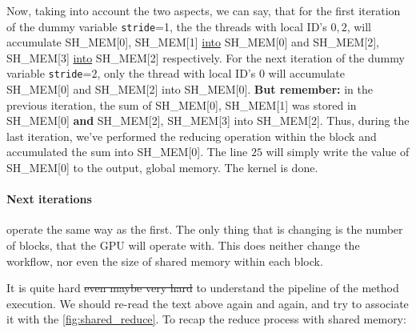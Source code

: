 Now, taking into account the two aspects, we can say, that for the first iteration of the dummy variable \verb|stride|=1, the 
the threads with local ID's $0,2$, will accumulate SH\_MEM[0], SH\_MEM[1] \underline{into} 
SH\_MEM[0] and SH\_MEM[2], SH\_MEM[3] \underline{into} SH\_MEM[2] respectively. 
For the next iteration of the dummy variable \verb|stride|=$2$, only the thread with local ID's $0$ 
will accumulate SH\_MEM[0] and SH\_MEM[2] into SH\_MEM[0]. \textbf{But remember: } in the previous iteration, 
the sum of SH\_MEM[0], SH\_MEM[1] was stored in SH\_MEM[0] \textbf{and} SH\_MEM[2], SH\_MEM[3] into SH\_MEM[2]. 
Thus, during the last iteration, we've performed the reducing operation within the block and accumulated the sum into SH\_MEM[0]. 
The line $25$ will simply write the value of SH\_MEM[0] to the output, global memory.  The kernel is done. 

\paragraph*{Next iterations} operate the same way as the first. The only thing that is changing is the number 
of blocks, that the GPU will operate with. This does neither change the workflow, nor even the size of 
shared memory within each block. 

It is quite hard \sout{even maybe very hard} to understand the pipeline of the method execution. 
We should re-read the text above again and again, and try to associate it with the \autoref{fig:shared_reduce}.
To recap the reduce process with shared memory:  

